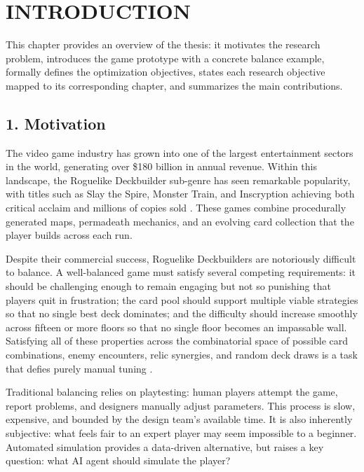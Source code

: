 \clearpage
{}
{}
\chapter*{INTRODUCTION}

This chapter provides an overview of the thesis: it motivates the research problem, introduces the game prototype with a concrete balance example, formally defines the optimization objectives, states each research objective mapped to its corresponding chapter, and summarizes the main contributions.

\section*{1. Motivation}

The video game industry has grown into one of the largest entertainment sectors in the world, generating over \$180 billion in annual revenue. Within this landscape, the Roguelike Deckbuilder sub-genre has seen remarkable popularity, with titles such as Slay the Spire, Monster Train, and Inscryption achieving both critical acclaim and millions of copies sold \cite{slaythespire}. These games combine procedurally generated maps, permadeath mechanics, and an evolving card collection that the player builds across each run.

Despite their commercial success, Roguelike Deckbuilders are notoriously difficult to balance. A well-balanced game must satisfy several competing requirements: it should be challenging enough to remain engaging but not so punishing that players quit in frustration; the card pool should support multiple viable strategies so that no single best deck dominates; and the difficulty should increase smoothly across fifteen or more floors so that no single floor becomes an impassable wall. Satisfying all of these properties across the combinatorial space of possible card combinations, enemy encounters, relic synergies, and random deck draws is a task that defies purely manual tuning \cite{schell2019art}.

Traditional balancing relies on playtesting: human players attempt the game, report problems, and designers manually adjust parameters. This process is slow, expensive, and bounded by the design team's available time. It is also inherently subjective: what feels fair to an expert player may seem impossible to a beginner. Automated simulation provides a data-driven alternative, but raises a key question: what AI agent should simulate the player?

